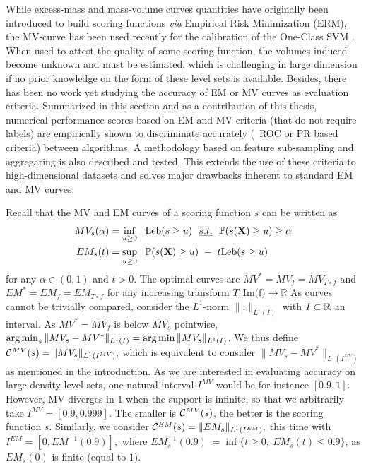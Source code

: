 While excess-mass and mass-volume curves quantities have originally been introduced to build scoring functions \emph{via}
Empirical Risk Minimization (ERM), the MV-curve has been used recently for the calibration of the One-Class SVM \citep{Thomas2015}.
When used to attest the quality of some scoring function, the volumes induced become unknown and must be estimated, which is challenging in large dimension if no prior knowledge on the form of these level sets is available.
%
Besides, there has been no work yet studying the accuracy of EM or MV curves as evaluation criteria.
%
Summarized in this section and as a contribution of this thesis, numerical performance scores based on EM and MV criteria (that do not require labels) are empirically shown to discriminate accurately (\wrt~ROC or PR based criteria) between algorithms.
A methodology based on feature sub-sampling and aggregating is also described and tested. This extends the use of these criteria to high-dimensional datasets and solves major drawbacks inherent to standard EM and MV curves.

Recall that the MV and EM curves of a scoring function $s$ can be written as
\noindent
\begin{align}
\label{intro:MV-def}
 MV_s(\alpha) &= \inf_{u \ge 0}~~ \text{Leb}(s \ge u) ~~\emph{s.t.}{}~~\mathbb{P}(s(\mathbf X) \ge u) \ge \alpha\\
\label{intro:EM-def}
 EM_s(t) &= \sup_{u \ge 0}~~ \mathbb{P}(s(\mathbf X) \ge u) ~-~ t \text{Leb}(s \ge u)
\end{align}
for any $\alpha\in (0,1)$ and $t >0$.
%
The optimal curves are $MV^* = MV_f = MV_{T \circ f}$ and $EM^* = EM_f = EM_{T \circ f}$ for any increasing transform $T: \text{Im(f)} \to \mathbb{R}$
%
As curves cannot be trivially compared, consider the $L^1$-norm $\|.\|_{L^1(I)}$ with $I\subset \mathbb{R}$ an interval. As $MV^*=MV_f$ is below $MV_s$ pointwise, $\argmin_s \| MV_s - MV^* \|_{L^1(I)} = \argmin \| MV_s \|_{L^1(I)} $. We thus define
$\mathcal{C}^{MV}(s) = \| MV_s \|_{L^1(I^{MV})},$ which is equivalent to consider $\| MV_s - MV^* \|_{L^1(I^{MV})}$ as mentioned in the introduction. As we are interested in evaluating accuracy on large density level-sets, one natural interval $I^{MV}$ would be for instance $[0.9, 1]$. However, MV diverges in $1$ when the support is infinite, so that we arbitrarily take $I^{MV} = [0.9, 0.999].$
The smaller is $\mathcal{C}^{MV}(s)$, the better is the scoring function $s$.
%
Similarly, we consider $\mathcal{C}^{EM}(s) = \| EM_s \|_{L^1(I^{EM})}, $ this time with $I^{EM} = [0,EM^{-1}(0.9)],$ where $EM_s^{-1}(0.9) := \inf\{t\ge 0,~ EM_s(t) \le 0.9\}$, as $EM_s(0)$ is finite (equal to $1$). %

